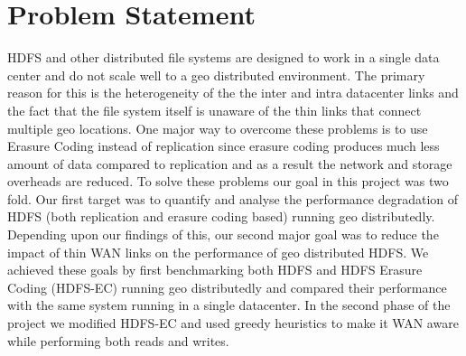 \documentclass{sig-alternate-05-2015}
\begin{document}
%
\author{
%
%
\alignauthor
Karan Bavishi \\
       \\
\alignauthor
Hasnain Ali Pirzada\\
\\
}

\maketitle
\section{Problem Statement}
HDFS and other distributed file systems are designed to work in a single data center and do not scale well to a geo distributed environment. The primary reason for this is the heterogeneity of the the inter and intra datacenter links and the fact that the file system itself is unaware of the thin links that connect multiple geo locations. One major way to overcome these problems is to use Erasure Coding instead of replication since erasure coding produces much less amount of data compared to replication and as a result the network and storage overheads are reduced. To solve these problems our goal in this project was two fold. Our first target was to quantify and analyse the performance degradation of HDFS (both replication and erasure coding based) running geo distributedly. Depending upon our findings of this, our second major goal was to reduce the impact of thin WAN links on the performance of geo distributed HDFS. We achieved these goals by first benchmarking both HDFS and HDFS Erasure Coding (HDFS-EC) running geo distributedly and compared their performance with the same system running in a single datacenter. In the second phase of the project we modified HDFS-EC and used greedy heuristics to make it WAN aware while performing both reads and writes.
\end{document}
